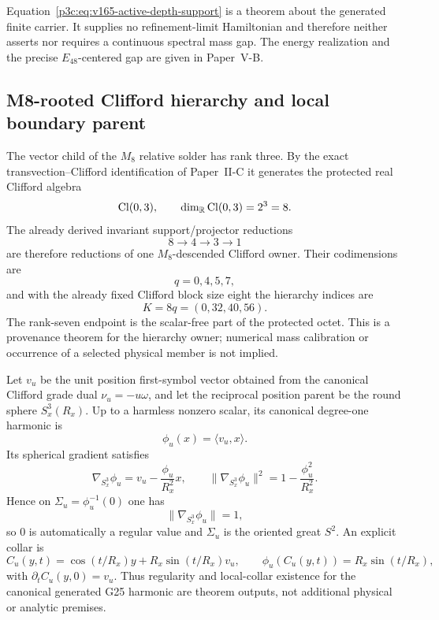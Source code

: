 \documentclass[12pt,a4paper]{article}
\begin{document}
\begin{remark}
\label{p3c:rem:v165-carrier-gap-not-continuum}
Equation~\eqref{p3c:eq:v165-active-depth-support} is a theorem about the
generated finite carrier.  It supplies no refinement-limit Hamiltonian and
therefore neither asserts nor requires a continuous spectral mass gap.  The
energy realization and the precise \(E_{48}\)-centered gap are given in
Paper~V-B.
\end{remark}

\subsection{M8-rooted Clifford hierarchy and local boundary parent}
\label{p3c:sec:v187-m8-rooted-hierarchy-boundary}

\begin{theorem}
\label{p3c:thm:v187-three-eight-seven}
The vector child of the $M_8$ relative solder has rank three.  By the exact
transvection--Clifford identification of Paper~II-C it generates the protected
real Clifford algebra
\[
 \operatorname{Cl}(0,3),\qquad \dim_{\mathbb R}\operatorname{Cl}(0,3)=2^3=8.
\]
The already derived invariant support/projector reductions
\[
 \boxed{8\longrightarrow4\longrightarrow3\longrightarrow1}
\]
are therefore reductions of one $M_8$-descended Clifford owner.  Their
codimensions are
\[
 \boxed{q=0,4,5,7},
\]
and with the already fixed Clifford block size eight the hierarchy indices are
\[
 \boxed{K=8q=(0,32,40,56).}
\]
The rank-seven endpoint is the scalar-free part of the protected octet.  This
is a provenance theorem for the hierarchy owner; numerical mass calibration
or occurrence of a selected physical member is not implied.
\end{theorem}

\begin{lemma}
\label{p3c:lem:v176-g25-canonical-boundary-regularity}
Let $v_u$ be the unit position first-symbol vector obtained from the canonical
Clifford grade dual $\nu_u=-u\omega$, and let the reciprocal position parent
be the round sphere $S_x^3(R_x)$.  Up to a harmless nonzero scalar, its
canonical degree-one harmonic is
\[
 \phi_u(x)=\langle v_u,x\rangle .
\]
Its spherical gradient satisfies
\[
 \nabla_{S_x^3}\phi_u
 =v_u-\frac{\phi_u}{R_x^2}x,
 \qquad
 \|\nabla_{S_x^3}\phi_u\|^2
 =1-\frac{\phi_u^2}{R_x^2}.
\]
Hence on $\Sigma_u=\phi_u^{-1}(0)$ one has
\[
 \boxed{\|\nabla_{S_x^3}\phi_u\|=1},
\]
so $0$ is automatically a regular value and $\Sigma_u$ is the oriented great
$S^2$.  An explicit collar is
\[
 C_u(y,t)=\cos(t/R_x)y+R_x\sin(t/R_x)v_u,
 \qquad
 \phi_u(C_u(y,t))=R_x\sin(t/R_x),
\]
with $\partial_tC_u(y,0)=v_u$.  Thus regularity and local-collar existence for
the canonical generated G25 harmonic are theorem outputs, not additional
physical or analytic premises.
\end{lemma}
\end{document}
